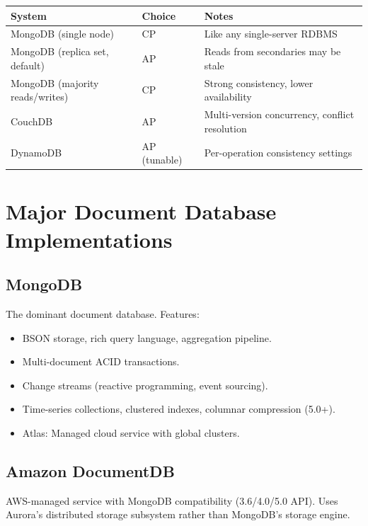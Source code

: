 \documentclass[12pt,a4paper]{article}
\begin{document}
\begin{center}
\begin{tabular}{@{}lll@{}}
\toprule
\textbf{System} & \textbf{Choice} & \textbf{Notes} \\
\midrule
MongoDB (single node) & CP & Like any single-server RDBMS \\
MongoDB (replica set, default) & AP & Reads from secondaries may be stale \\
MongoDB (majority reads/writes) & CP & Strong consistency, lower availability \\
CouchDB & AP & Multi-version concurrency, conflict resolution \\
DynamoDB & AP (tunable) & Per-operation consistency settings \\
\bottomrule
\end{tabular}
\end{center}

\section{Major Document Database Implementations}

\subsection{MongoDB}

The dominant document database. Features:
\begin{itemize}[noitemsep]
    \item BSON storage, rich query language, aggregation pipeline.
    \item Multi-document ACID transactions.
    \item Change streams (reactive programming, event sourcing).
    \item Time-series collections, clustered indexes, columnar compression (5.0+).
    \item Atlas: Managed cloud service with global clusters.
\end{itemize}

\subsection{Amazon DocumentDB}

AWS-managed service with MongoDB compatibility (3.6/4.0/5.0 API). Uses Aurora's distributed storage subsystem rather than MongoDB's storage engine.
\end{document}
